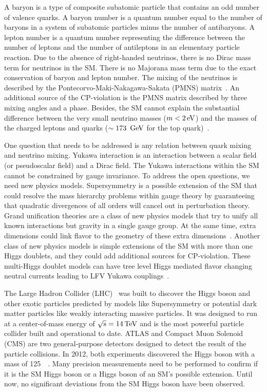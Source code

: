 A baryon is a type of composite subatomic particle that contains an odd number of valence quarks. A baryon number is a quantum number equal to the number of baryons in a system of subatomic particles minus the number of antibaryons. A lepton number is a quantum number representing the difference between the number of leptons and the number of antileptons in an elementary particle reaction. Due to the absence of right-handed neutrinos, there is no Dirac mass term for neutrinos in the SM. There is no Majorana mass term due to the exact conservation of baryon and lepton number. The mixing of the neutrinos is described by the Pontecorvo-Maki-Nakagawa-Sakata (PMNS) matrix~\cite{Tanabashi:2018oca}. An additional source of the CP-violation is the PMNS matrix described by three mixing angles and a phase. Besides, the SM cannot explain the substantial difference between the very small neutrino masses ($m < 2 \,\text{e\hspace{-.08em}V}$) and the masses of the charged leptons and quarks ($\sim 173~\,\text{Ge\hspace{-.08em}V}$ for the top quark)~\cite{Tanabashi:2018oca}.

One question that needs to be addressed is any relation between quark mixing and neutrino mixing. Yukawa interaction is an interaction between a scalar field (or pseudoscalar field) and a Dirac field. The Yukawa interactions within the SM cannot be constrained by gauge invariance. To address the open questions, we need new physics models. Supersymmetry is a possible extension of the SM that could resolve the mass hierarchy problems within gauge theory by guaranteeing that quadratic divergences of all orders will cancel out in perturbation theory. Grand unification theories are a class of new physics models that try to unify all known interactions but gravity in a single gauge group. At the same time, extra dimensions could link flavor to the geometry of these extra dimensions~\cite{Raidal:2008jk}. Another class of new physics models is simple extensions of the SM with more than one Higgs doublets, and they could add additional sources for CP-violation. These multi-Higgs doublet models can have tree level Higgs mediated flavor changing neutral currents leading to LFV Yukawa couplings~\cite{Raidal:2008jk}.

The Large Hadron Collider (LHC)~\cite{Evans:2008zzb} was built to discover the Higgs boson and other exotic particles predicted by models like Supersymmetry or potential dark matter particles like weakly interacting massive particles. It was designed to run at a center-of-mass energy of $\sqrt{\text{s}} = 14 \,\text{Te\hspace{-.08em}V}$ and is the most powerful particle collider built and operational to date. ATLAS and Compact Muon Solenoid (CMS) are two general-purpose detectors designed to detect the result of the particle collisions. In 2012, both experiments discovered the Higgs boson with a mass of 125~\GeV~\cite{Aad:2012tfa, Chatrchyan:2012ufa}. Many precision measurements need to be performed to confirm if it is the SM Higgs boson or a Higgs boson of an SM's possible extension. Until now, no significant deviations from the SM Higgs boson have been observed.

